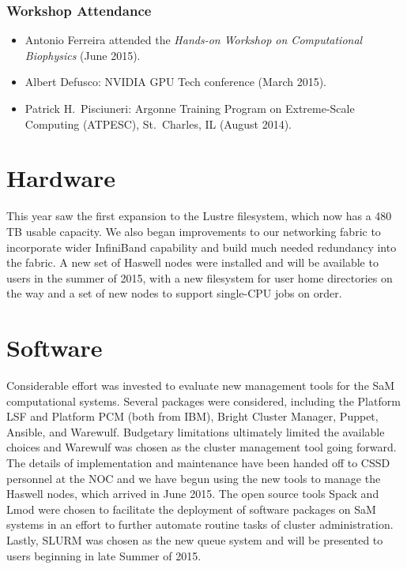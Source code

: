 \subsubsection{Workshop Attendance}
\begin{itemize}
    \item Antonio Ferreira attended the \textit{Hands-on Workshop on
Computational Biophysics} (June 2015).

    \item Albert Defusco: NVIDIA GPU Tech conference (March 2015).

    \item Patrick H.\ Pisciuneri: Argonne Training Program on Extreme-Scale Computing (ATPESC), St.\ Charles, IL (August 2014).

\end{itemize}

\section{Hardware}
This year saw the first expansion to the Lustre filesystem, which now has a 480 TB usable capacity.  We also began improvements to our networking fabric to incorporate wider InfiniBand capability and build much needed redundancy into the fabric.  A new set of Haswell nodes were installed and will be available to users in the summer of 2015, with a new filesystem for user home directories on the way and a set of new nodes to support single-CPU jobs on order.

\section{Software}
Considerable effort was invested to evaluate new management tools for the SaM computational systems.  Several packages were considered, including the Platform LSF and Platform PCM (both from IBM), Bright Cluster Manager, Puppet, Ansible, and Warewulf.  Budgetary limitations ultimately limited the available choices and Warewulf was chosen as the cluster management tool going forward. The details of implementation and maintenance have been handed off to CSSD personnel at the NOC and we have begun using the new tools to manage the
Haswell nodes, which arrived in June 2015.  The open source tools Spack and
Lmod were chosen to facilitate the deployment of software packages on SaM
systems in an effort to further automate routine tasks of cluster
administration.  Lastly, SLURM was chosen as the new queue system and will be
presented to users beginning in late Summer of 2015.

